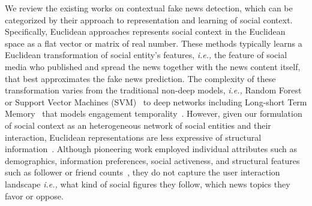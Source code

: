 \documentclass[fyp]{socreport}
\theoremstyle{definition}
\theoremstyle{hypothesis}
\begin{document}
We review the existing works on contextual fake news detection, which can be categorized by their approach to representation and learning of social context. Specifically, Euclidean approaches represents social context in the Euclidean space as a flat vector or matrix of real number. These methods typically learns a Euclidean transformation of social entity's features, \textit{i.e.,} the feature of social media who published and spread the news together with the news content itself, that best approximates the fake news prediction. The complexity of these transformation varies from the traditional non-deep models, \textit{i.e.,} Random Forest or Support Vector Machines (SVM)~\cite{castillo2011information,yang2012automatic} to deep networks including Long-short Term Memory~\cite{lstm1997hochreiter} that models engagement temporality~\cite{ruchansky2017csi}. However, given our formulation of social context as an heterogeneous network of social entities and their interaction, Euclidean representations are less expressive of structural information~\cite{bronstein2017geometric}. Although pioneering work employed individual attributes such as demographics, information preferences, social activeness, and structural features such as follower or friend counts~\cite{ma2015detect,shu2017fake}, they do not capture the user interaction landscape \textit{i.e.,} what kind of social figures they follow, which news topics they favor or oppose.


\end{document}
